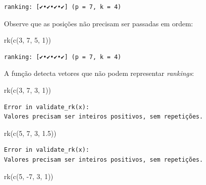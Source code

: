 \documentclass[
  letterpaper,
  DIV=11,
  numbers=noendperiod]{scrreprt}
\newenvironment{Shaded}{\begin{snugshade}}{\end{snugshade}}
\newcommand{\DecValTok}[1]{\textcolor[rgb]{0.68,0.00,0.00}{#1}}
\newcommand{\FloatTok}[1]{\textcolor[rgb]{0.68,0.00,0.00}{#1}}
\newcommand{\FunctionTok}[1]{\textcolor[rgb]{0.28,0.35,0.67}{#1}}
\newcommand{\NormalTok}[1]{\textcolor[rgb]{0.00,0.23,0.31}{#1}}
\newcommand{\SpecialCharTok}[1]{\textcolor[rgb]{0.37,0.37,0.37}{#1}}
\begin{document}
\begin{verbatim}
ranking: [✔•✔•✔•✔] (p = 7, k = 4)
\end{verbatim}

Observe que as posições não precisam ser passadas em ordem:

\begin{Shaded}
\begin{Highlighting}[]
\FunctionTok{rk}\NormalTok{(}\FunctionTok{c}\NormalTok{(}\DecValTok{3}\NormalTok{, }\DecValTok{7}\NormalTok{, }\DecValTok{5}\NormalTok{, }\DecValTok{1}\NormalTok{))}
\end{Highlighting}
\end{Shaded}

\begin{verbatim}
ranking: [✔•✔•✔•✔] (p = 7, k = 4)
\end{verbatim}

A função detecta vetores que não podem representar \emph{rankings}:

\begin{Shaded}
\begin{Highlighting}[]
\FunctionTok{rk}\NormalTok{(}\FunctionTok{c}\NormalTok{(}\DecValTok{3}\NormalTok{, }\DecValTok{7}\NormalTok{, }\DecValTok{3}\NormalTok{, }\DecValTok{1}\NormalTok{))}
\end{Highlighting}
\end{Shaded}

\begin{verbatim}
Error in validate_rk(x): 
Valores precisam ser inteiros positivos, sem repetições.
\end{verbatim}

\begin{Shaded}
\begin{Highlighting}[]
\FunctionTok{rk}\NormalTok{(}\FunctionTok{c}\NormalTok{(}\DecValTok{5}\NormalTok{, }\DecValTok{7}\NormalTok{, }\DecValTok{3}\NormalTok{, }\FloatTok{1.5}\NormalTok{))}
\end{Highlighting}
\end{Shaded}

\begin{verbatim}
Error in validate_rk(x): 
Valores precisam ser inteiros positivos, sem repetições.
\end{verbatim}

\begin{Shaded}
\begin{Highlighting}[]
\FunctionTok{rk}\NormalTok{(}\FunctionTok{c}\NormalTok{(}\DecValTok{5}\NormalTok{, }\SpecialCharTok{{-}}\DecValTok{7}\NormalTok{, }\DecValTok{3}\NormalTok{, }\DecValTok{1}\NormalTok{))}
\end{Highlighting}
\end{Shaded}
\end{document}
